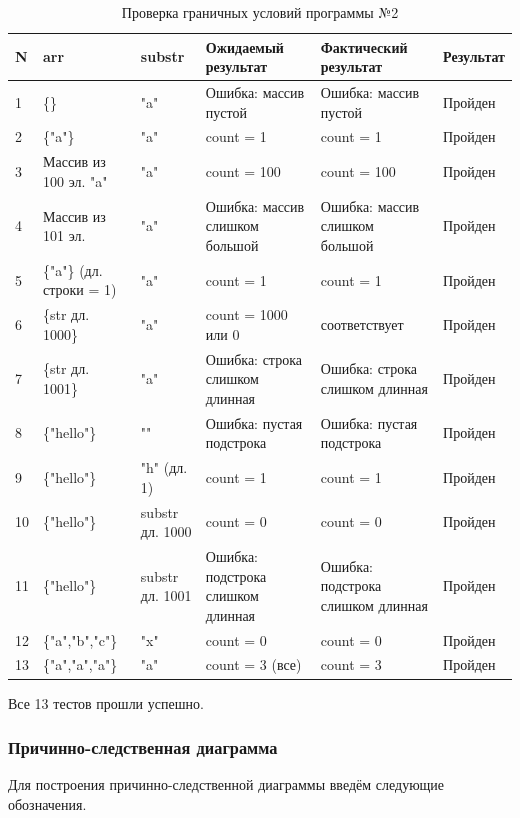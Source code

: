 \documentclass{article}[14pt]
\begin{document}
{\centering\large{
\begin{longtable}{|p{0.4cm}|p{3.5cm}|p{2.5cm}|p{3cm}|p{3cm}|p{2cm}|}
	\caption{Проверка граничных условий программы №2}\\
	\hline
	N & arr & substr & Ожидаемый результат & Фактический результат & Результат \\ \hline
	1 & \{\} & "a" & Ошибка: массив пустой & Ошибка: массив пустой & Пройден \\ \hline
	2 & \{"a"\} & "a" & count = 1 & count = 1 & Пройден \\ \hline
	3 & Массив из 100 эл. "a" & "a" & count = 100 & count = 100 & Пройден \\ \hline
	4 & Массив из 101 эл. & "a" & Ошибка: массив слишком большой & Ошибка: массив слишком большой & Пройден \\ \hline
	5 & \{"a"\} (дл. строки = 1) & "a" & count = 1 & count = 1 & Пройден \\ \hline
	6 & \{str дл. 1000\} & "a" & count = 1000 или 0 & соответствует & Пройден \\ \hline
	7 & \{str дл. 1001\} & "a" & Ошибка: строка слишком длинная & Ошибка: строка слишком длинная & Пройден \\ \hline
	8 & \{"hello"\} & "" & Ошибка: пустая подстрока & Ошибка: пустая подстрока & Пройден \\ \hline
	9 & \{"hello"\} & "h" (дл. 1) & count = 1 & count = 1 & Пройден \\ \hline
	10 & \{"hello"\} & substr дл. 1000 & count = 0 & count = 0 & Пройден \\ \hline
	11 & \{"hello"\} & substr дл. 1001 & Ошибка: подстрока слишком длинная & Ошибка: подстрока слишком длинная & Пройден \\ \hline
	12 & \{"a","b","c"\} & "x" & count = 0 & count = 0 & Пройден \\ \hline
	13 & \{"a","a","a"\} & "a" & count = 3 (все) & count = 3 & Пройден \\ \hline
\end{longtable}}}

Все 13 тестов прошли успешно.

\subsubsection{Причинно-следственная диаграмма}

Для построения причинно-следственной диаграммы введём следующие обозначения.
\end{document}
